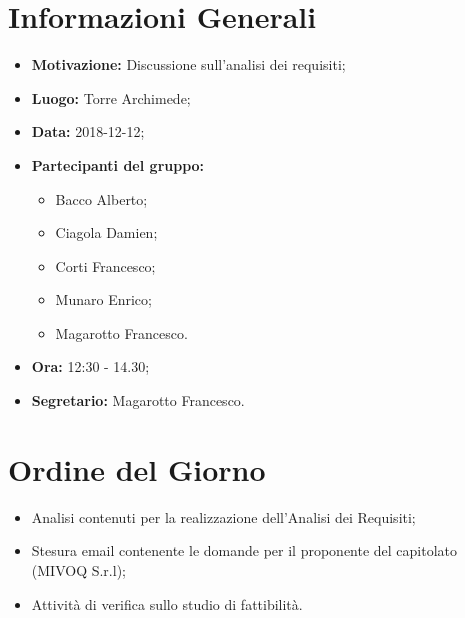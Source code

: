 \documentclass[a4paper, oneside, openany, dvipsnames, table]{article}
\begin{document}
\copertina{}


\newpage
\tableofcontents
\newpage

\section{Informazioni Generali}
\begin{itemize}
\item \textbf{Motivazione:} Discussione sull'analisi dei requisiti;
\item \textbf{Luogo:} Torre Archimede;
\item \textbf{Data:} 2018-12-12;
\item \textbf{Partecipanti del gruppo:}
	\begin{itemize}
	\item Bacco Alberto;
	\item Ciagola Damien;
	\item Corti Francesco;
	\item Munaro Enrico;
	\item Magarotto Francesco.
	\end{itemize} 
\item \textbf{Ora:} 12:30 - 14.30;
\item \textbf{Segretario:} Magarotto Francesco.
\end{itemize}

\section{Ordine del Giorno}
\begin{itemize}
\item Analisi contenuti per la realizzazione dell'Analisi dei Requisiti;
\item Stesura email contenente le domande per il proponente del capitolato (MIVOQ S.r.l);
\item Attività di verifica sullo studio di fattibilità.
\end{itemize}
\end{document}
